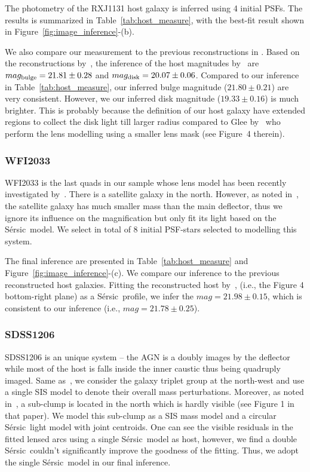 \documentclass[fleqn,usenatbib]{mnras}
\newcommand{\sersic}{S\'ersic}
\begin{document}
The photometry of the RXJ1131 host galaxy is inferred using 4 initial PSFs. The results is summarized in Table~\ref{tab:host_measure}, with the best-fit result shown in Figure~\ref{fig:image_inference}-(b).

We also compare our measurement to the previous reconstructions in \citet{Ding2017b}. Based on the reconstructions by~\citet{Suyu2013}, the inference of the host magnitudes by~\citet{Ding2017b} are $mag_{\rm bulge} = 21.81 \pm 0.28$ and $mag_{\rm disk} = 20.07\pm0.06$. Compared to our inference in Table~\ref{tab:host_measure}, our inferred bulge magnitude ($21.80\pm0.21$) are very consistent. However, we our inferred disk magnitude ($19.33\pm0.16$) is much brighter. This is probably because the definition of our host galaxy have extended regions to collect the disk light till larger radius compared to Glee by~\citet{Suyu2013} who perform the lens modelling using a smaller lens mask (see Figure~4 therein). 

\subsubsection{WFI2033}
WFI2033 is the last quads in our sample whose lens model has been recently investigated by~\citet{Rusu2019}. There is a satellite galaxy in the north. However, as noted in~\citet{Rusu2019}, the satellite galaxy has much smaller mass than the main deflector, thus we ignore its influence on the magnification but only fit its light based on the \sersic\ model. We select in total of 8 initial PSF-stars selected to modelling this system.

The final inference are presented in Table~\ref{tab:host_measure} and Figure~\ref{fig:image_inference}-(c). We compare our inference to the previous reconstructed host galaxies. Fitting the reconstructed host by~\citet{Rusu2019}, (i.e., the Figure 4 bottom-right plane) as a \sersic\ profile, we infer the $mag = 21.98 \pm 0.15$, which is consistent to our inference (i.e., $mag = 21.78 \pm 0.25$).

\subsubsection{SDSS1206}
SDSS1206 is an unique system -- the AGN is a doubly images by the deflector while most of the host is falls inside the inner caustic thus being quadruply imaged. Same as~\citet{Birrer2019}, we consider the galaxy triplet group at the north-west and use a single SIS model to denote their overall mass perturbations. Moreover, as noted in~\citet{Birrer2019}, a sub-clump is located in the north which is hardly visible (see Figure 1 in that paper). We model this sub-clump as a SIS mass model and a circular \sersic\ light model with joint centroids. One can see the visible residuals in the fitted lensed arcs using a single \sersic\ model as host, however, we find a double \sersic\ couldn't significantly improve the goodness of the fitting. Thus, we adopt the single \sersic\ model in our final inference. 
\end{document}
